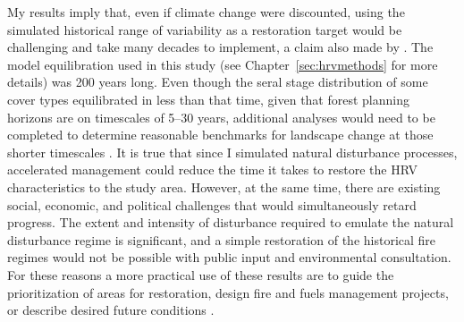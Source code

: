 
My results imply that, even if climate change were discounted, using the simulated historical range of variability as a restoration target would be challenging and take many decades to implement, a claim also made by \citet{Collins2011}. The model equilibration used in this study (see Chapter~\ref{sec:hrvmethods} for more details) was 200 years long. Even though the seral stage distribution of some cover types equilibrated in less than that time, given that forest planning horizons are on timescales of 5--30 years, additional analyses would need to be completed to determine reasonable benchmarks for landscape change at those shorter timescales \citep{Millar1999,Millar2014}. It is true that since I simulated natural disturbance processes, accelerated management could reduce the time it takes to restore the HRV characteristics to the study area. However, at the same time, there are existing social, economic, and political challenges that would simultaneously retard progress. The extent and intensity of disturbance required to emulate the natural disturbance regime is significant, and a simple restoration of the historical fire regimes would not be possible with public input and environmental consultation. For these reasons a more practical use of these results are to guide the prioritization of areas for restoration, design fire and fuels management projects, or describe desired future conditions \citep{Keeley2000,Fule2008,Safford2014}.

